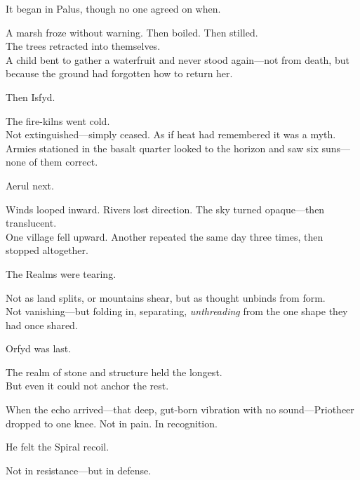 \documentclass[12pt]{article}
\begin{document}
\vspace{0.5em}
It began in Palus, though no one agreed on when.

\vspace{0.5em}
A marsh froze without warning. Then boiled. Then stilled.\\
The trees retracted into themselves.\\
A child bent to gather a waterfruit and never stood again---not from death, but because the ground had forgotten how to return her.

\vspace{0.5em}
Then Isfyd.

\vspace{0.5em}
The fire-kilns went cold.\\
Not extinguished---simply ceased. As if heat had remembered it was a myth.\\
Armies stationed in the basalt quarter looked to the horizon and saw six suns---none of them correct.

\vspace{0.5em}
Aerul next.

\vspace{0.5em}
Winds looped inward. Rivers lost direction. The sky turned opaque---then translucent.\\
One village fell upward. Another repeated the same day three times, then stopped altogether.

\vspace{0.5em}
The Realms were tearing.

\vspace{0.5em}
Not as land splits, or mountains shear, but as thought unbinds from form.\\
Not vanishing---but folding in, separating, \textit{unthreading} from the one shape they had once shared.

\vspace{0.5em}
Orfyd was last.

\vspace{0.5em}
The realm of stone and structure held the longest.\\
But even it could not anchor the rest.

\vspace{0.5em}
When the echo arrived---that deep, gut-born vibration with no sound---Priotheer dropped to one knee. Not in pain. In recognition.

\vspace{0.5em}
He felt the Spiral recoil.

\vspace{0.5em}
Not in resistance---but in defense.
\end{document}
